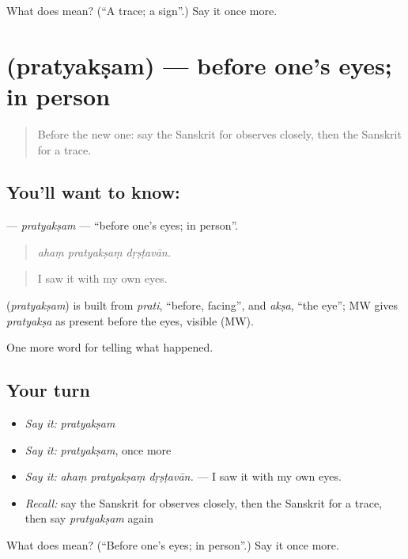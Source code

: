 \begin{tcolorbox}[breakable,colback=teal!4,colframe=teal!35!black,title={Before you move on}]
What does  mean? (\textquotedblleft{}A trace; a sign\textquotedblright{}.) Say it once more.
\end{tcolorbox}
\section[\texorpdfstring{\sk{प्रत्यक्षम्} (pratyakṣam)}{प्रत्यक्षम् (pratyakṣam)}]{ (pratyakṣam) — before one's eyes; in person}

\label{lesson:SA-C289-pratyaksam}



\begin{quote}
Before the new one: say the Sanskrit for observes closely, then the Sanskrit for a trace.
\end{quote}

\subsection*{You'll want to know: }
\textbf{} — \emph{pratyakṣam} — \textquotedblleft{}before one's eyes; in person\textquotedblright{}.

\begin{quote}
  
\end{quote}

\begin{quote}
\emph{ahaṃ pratyakṣaṃ dṛṣṭavān.}
\end{quote}

\begin{quote}
I saw it with my own eyes.
\end{quote}

\begin{cousinweb}
\textbf{} (\emph{pratyakṣam}) is built from \emph{prati}, \textquotedblleft{}before, facing\textquotedblright{}, and \emph{akṣa}, \textquotedblleft{}the eye\textquotedblright{}; MW gives \emph{pratyakṣa} as present before the eyes, visible (MW).
\end{cousinweb}

\begin{grammarlens}[title={What you've built}]
One more word for telling what happened.
\end{grammarlens}

\subsection*{Your turn}
\begin{itemize}
\raggedright
  \item \emph{Say it:} \emph{pratyakṣam}
  \item \emph{Say it:} \emph{pratyakṣam}, once more
  \item \emph{Say it:} \emph{ahaṃ pratyakṣaṃ dṛṣṭavān.} — I saw it with my own eyes.
  \item \emph{Recall:} say the Sanskrit for observes closely, then the Sanskrit for a trace, then say \emph{pratyakṣam} again
\end{itemize}

\begin{tcolorbox}[breakable,colback=teal!4,colframe=teal!35!black,title={Before you move on}]
What does  mean? (\textquotedblleft{}Before one's eyes; in person\textquotedblright{}.) Say it once more.
\end{tcolorbox}

